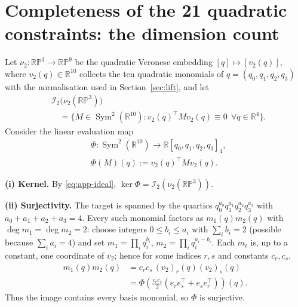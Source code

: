 \section{Completeness of the 21 quadratic constraints: the dimension count}\label{app:dimcount}

Let $\nu_2:\mathbb{RP}^3\to\mathbb{RP}^9$ be the quadratic Veronese embedding $[q]\mapsto[v_2(q)]$, where $v_2(q)\in\mathbb{R}^{10}$ collects the ten quadratic monomials of $q=(q_0,q_1,q_2,q_3)$ with the normalisation used in Section~\ref{sec:lift}, and let
\begin{equation}
\begin{split}
&\mathcal{I}_2\big(\nu_2(\mathbb{RP}^3)\big)\\
&\quad=\Big\{M\in\operatorname{Sym}^2(\mathbb{R}^{10}):
v_2(q)^\top Mv_2(q)\equiv0\ \ \forall q\in\mathbb{R}^4\Big\}.
\end{split}
\label{eq:app-ideal}
\end{equation}
Consider the linear evaluation map
\begin{equation}
\begin{split}
&\Phi:\operatorname{Sym}^2(\mathbb{R}^{10})\longrightarrow\mathbb{R}[q_0,q_1,q_2,q_3]_4,\\
&\Phi(M)(q):=v_2(q)^\top Mv_2(q).
\end{split}
\label{eq:app-phi}
\end{equation}

\textbf{(i) Kernel.} By \eqref{eq:app-ideal}, $\ker\Phi=\mathcal{I}_2(\nu_2(\mathbb{RP}^3))$.

\textbf{(ii) Surjectivity.} The target is spanned by the quartics $q_0^{a_0}q_1^{a_1}q_2^{a_2}q_3^{a_3}$ with $a_0+a_1+a_2+a_3=4$. Every such monomial factors as $m_1(q)m_2(q)$ with $\deg m_1=\deg m_2=2$: choose integers $0\le b_i\le a_i$ with $\sum_ib_i=2$ (possible because $\sum_ia_i=4$) and set $m_1=\prod_iq_i^{b_i}$, $m_2=\prod_iq_i^{a_i-b_i}$. Each $m_\ell$ is, up to a constant, one coordinate of $v_2$; hence for some indices $r,s$ and constants $c_r,c_s$,
\begin{equation}
\begin{split}
m_1(q)m_2(q)&=c_rc_s\,(v_2)_r(q)(v_2)_s(q)\\
&=\Phi\!\left(\tfrac{c_rc_s}{2}(e_re_s^\top+e_se_r^\top)\right)(q).
\end{split}
\label{eq:app-monomial}
\end{equation}
Thus the image contains every basis monomial, so $\Phi$ is surjective.

